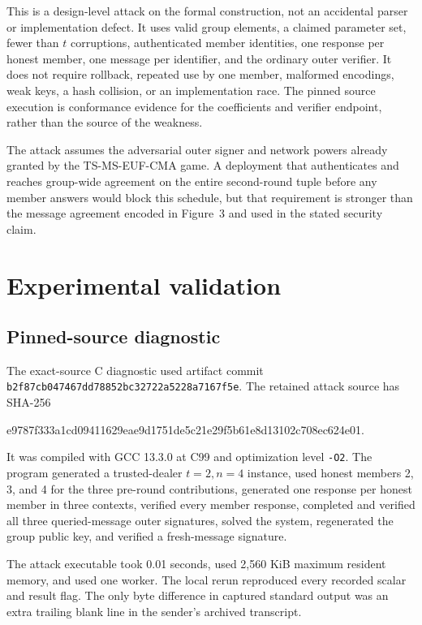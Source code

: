 \documentclass[10pt,a4paper]{article}
\begin{document}
This is a design-level attack on the formal construction, not an accidental
parser or implementation defect. It uses valid group elements, a claimed
parameter set, fewer than $t$ corruptions, authenticated member identities,
one response per honest member, one message per identifier, and the ordinary
outer verifier. It does not require rollback, repeated use by one member,
malformed encodings, weak keys, a hash collision, or an implementation race.
The pinned source execution is conformance evidence for the coefficients and
verifier endpoint, rather than the source of the weakness.

The attack assumes the adversarial outer signer and network powers already
granted by the TS-MS-EUF-CMA game. A deployment that authenticates and reaches
group-wide agreement on the entire second-round tuple before any member
answers would block this schedule, but that requirement is stronger than the
message agreement encoded in Figure~3 and used in the stated security claim.

\section{Experimental validation}

\subsection{Pinned-source diagnostic}

The exact-source C diagnostic used artifact commit
\texttt{b2f87cb047467dd78852bc32722a5228a7167f5e}. The retained attack source has
SHA-256
\begin{center}
\small\ttfamily
e9787f333a1cd09411629eae9d1751de5c21e29f5b61e8d13102c708ec624e01.
\end{center}
It was compiled with GCC 13.3.0 at C99 and optimization level \texttt{-O2}.
The program generated a trusted-dealer $t=2,n=4$ instance, used honest members
2, 3, and 4 for the three pre-round contributions, generated one response per
honest member in three contexts, verified every member response, completed and
verified all three queried-message outer signatures, solved the system,
regenerated the group public key, and verified a fresh-message signature.

The attack executable took 0.01 seconds, used 2,560 KiB maximum resident
memory, and used one worker. The local rerun reproduced every recorded scalar
and result flag. The only byte difference in captured standard output was an
extra trailing blank line in the sender's archived transcript.
\end{document}
